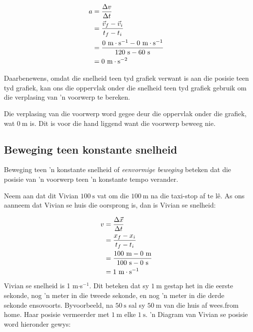     \begin{align*}
    a &= \frac{\Delta v}{\Delta t}\hfill \\ 
    &= \frac{\vec{v}_{f}-\vec{v}_{i}}{{t}_{f}-{t}_{i}}\hfill \\ 
    &= \frac{0~\text{m}\cdot\text{s}^{-1}-0~\text{m}\cdot\text{s}^{-1}}{120~\text{s}-60~\text{s}}\\ 
    &= 0~\text{m}\cdot\text{s}^{-2}
      \end{align*}

Daarbenewens, omdat die snelheid teen tyd grafiek verwant is aan die posisie teen tyd grafiek, kan ons die oppervlak onder die snelheid teen tyd grafiek gebruik om die verplasing van 'n voorwerp te bereken.\par 

	\par

Die verplasing van die voorwerp word gegee deur die oppervlak onder die grafiek, wat $0~\text{m}$ is. Dit is voor die hand liggend want die voorwerp beweeg nie.\par 


\subsection*{Beweging teen konstante snelheid}
\nopagebreak
Beweging teen 'n konstante snelheid of \textsl{eenvormige beweging} beteken dat die posisie van 'n voorwerp teen 'n konstante tempo verander.\par 
Neem aan dat dit Vivian $100~\text{s}$ vat om die $100~\text{m}$ na die taxi-stop af te l\^e. As ons aanneem dat Vivian se huis die oorsprong is, dan is Vivian se snelheid:\par 
        \label{m38795*id69850}\nopagebreak\noindent{}
          
    \begin{align*}
    	v&= \frac{\Delta \vec{x}}{\Delta t}\hfill \\ 
	&= \frac{{x}_{f}-{x}_{i}}{{t}_{f}-{t}_{i}}\hfill \\ 
	&= \frac{100~\text{m}-0~\text{m}}{100~\text{s}-0~\text{s}}\\ 
	 &= 1~\text{m}\cdot{\text{s}}^{-1}
      \end{align*}
Vivian se snelheid is 1 m$\ensuremath{\cdot}$s${}^{-1}$. Dit beteken dat sy $1~\text{m}$ gestap het in die eerste sekonde, nog 'n meter in die tweede sekonde, en nog 'n meter in die derde sekonde ensovoorts. Byvoorbeeld, na $50~\text{s}$ sal sy $50~\text{m}$ van die huis af wees.from home. Haar posisie vermeerder met $1~\text{m}$ elke $1~\text{s}$. 'n Diagram van Vivian se posisie word hieronder gewys:\par 

